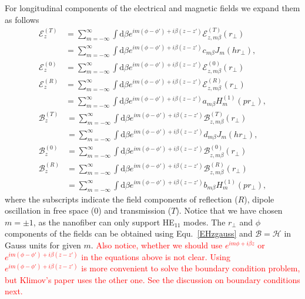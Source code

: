 \documentclass[]{report}
\begin{document}
For longitudinal components of the electrical and magnetic fields we expand them as follows
\begin{subequations}\label{ET0Rexpand}
\begin{align}
\mathcal{E}^{(T)}_z &= \sum_{m=-\infty}^\infty \int \mathrm{d}\beta e^{im(\phi-\phi') + i\beta (z-z')} \mathcal{E}^{(T)}_{z,m\beta}(r\!_\perp)\\
&= \sum_{m=-\infty}^\infty \int \mathrm{d}\beta e^{im(\phi-\phi') + i\beta (z-z')} c_{m\beta} J_m (hr\!_\perp),\\
\mathcal{E}^{(0)}_{z} &= \sum_{m=-\infty}^\infty \int \mathrm{d}\beta e^{im(\phi-\phi') + i\beta (z-z')} \mathcal{E}^{(0)}_{z,m\beta}(r\!_\perp)\\
\mathcal{E}^{(R)}_z &= \sum_{m=-\infty}^\infty \int \mathrm{d}\beta e^{im(\phi-\phi') + i\beta (z-z')} \mathcal{E}^{(R)}_{z,m\beta}(r\!_\perp)\\
&= \sum_{m=-\infty}^\infty \int \mathrm{d}\beta e^{im(\phi-\phi') + i\beta (z-z')} a_{m\beta} H_m^{(1)} (pr\!_\perp),
\end{align}
\end{subequations}
\begin{subequations}\label{BT0Rexpand}
\begin{align}
\mathcal{B}^{(T)}_z &= \sum_{m=-\infty}^\infty \int \mathrm{d}\beta e^{im(\phi-\phi') + i\beta (z-z')} \mathcal{B}^{(T)}_{z,m\beta}(r\!_\perp)\\
&= \sum_{m=-\infty}^\infty \int \mathrm{d}\beta e^{im(\phi-\phi') + i\beta (z-z')} d_{m\beta} J_m (hr\!_\perp),\\
\mathcal{B}^{(0)}_{z} &= \sum_{m=-\infty}^\infty \int \mathrm{d}\beta e^{im(\phi-\phi') + i\beta (z-z')} \mathcal{B}^{(0)}_{z,m\beta}(r\!_\perp)\\
\mathcal{B}^{(R)}_z &= \sum_{m=-\infty}^\infty \int \mathrm{d}\beta e^{im(\phi-\phi') + i\beta (z-z')} \mathcal{B}^{(R)}_{z,m\beta}(r\!_\perp)\\
&= \sum_{m=-\infty}^\infty \int \mathrm{d}\beta e^{im(\phi-\phi') + i\beta (z-z')} b_{m\beta} H_m^{(1)} (pr\!_\perp),
\end{align}
\end{subequations}
where the subscripts indicate the field components of reflection ($R$), dipole oscillation in free space ($0$) and transmission ($ T $). Notice that we have chosen $ m=\pm 1 $, as the nanofiber can only support HE$_{11}$ modes. 
The $ r\!_\perp $ and $ \phi $ components of the fields can be obtained using Equ.~\ref{EHzgauss} and $ \mathcal{B}=\mathcal{H} $ in Gauss units for given $ m $. \textcolor{red}{Also notice, whether we should use $ e^{im\phi + i\beta z} $ or $ e^{im(\phi-\phi') + i\beta (z-z')} $ in the equations above is not clear. Using $ e^{im(\phi-\phi') + i\beta (z-z')} $ is more convenient to solve the boundary condition problem, but Klimov's paper uses the other one. See the discussion on boundary conditions next.}
\end{document}
